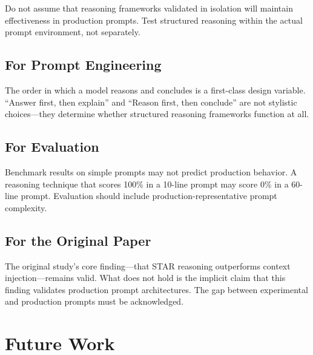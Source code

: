\documentclass[11pt]{article}
\begin{document}
Do not assume that reasoning frameworks validated in isolation will maintain effectiveness in production prompts. Test structured reasoning within the actual prompt environment, not separately.

\subsection{For Prompt Engineering}

The order in which a model reasons and concludes is a first-class design variable. ``Answer first, then explain'' and ``Reason first, then conclude'' are not stylistic choices---they determine whether structured reasoning frameworks function at all.

\subsection{For Evaluation}

Benchmark results on simple prompts may not predict production behavior. A reasoning technique that scores 100\% in a 10-line prompt may score 0\% in a 60-line prompt. Evaluation should include production-representative prompt complexity.

\subsection{For the Original Paper}

The original study's core finding---that STAR reasoning outperforms context injection---remains valid. What does not hold is the implicit claim that this finding validates production prompt architectures. The gap between experimental and production prompts must be acknowledged.

\section{Future Work}
\end{document}
